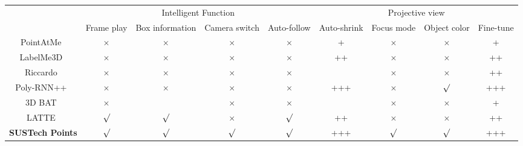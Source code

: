 \documentclass[letterpaper, 10 pt, conference]{ieeeconf}  %
\begin{document}
\begin{table}[]
	\begin{tabular}{c||c|c|c|c||c|c|c|c}
		\hline
		\hline
		\multirow{2}{*}{} & \multicolumn{4}{c||}{Intelligent Function}                         & \multicolumn{4}{c}{Projective view}                 \\
		\cline{2-9}     & Frame play & Box information & Camera switch & Auto-follow & Auto-shrink & Focus mode & Object color & Fine-tune \\ \hline
		PointAtMe~\cite{pointatme}         & $\times$         &   $\times$      &   $\times$    &  $\times$   &      +      &   $\times$ &   $\times$   &    +       \\ \hline
		LabelMe3D~\cite{LabelMe3D}         & $\times$         &   $\times$      &   $\times$    &  $\times$   &     ++      &   $\times$ &   $\times$   &   ++       \\ \hline
		Riccardo~\cite{monica2017multi}          & $\times$         &   $\times$      &   $\times$    &  $\times$   &             &   $\times$ &   $\times$   &   ++       \\ \hline
		Poly-RNN++~\cite{PolyRNN++}        & $\times$         &   $\times$      &   $\times$    &  $\times$   &     +++     &   $\times$ &   $\surd$    &  +++        \\ \hline
		3D BAT~\cite{Zimmer20193DBA}            & $\times$         &                 &   $\times$    &  $\times$   &             &   $\times$ &   $\times$   &    +        \\ \hline
		LATTE~\cite{Wang2019LATTEAL}           & $\surd$          &   $\surd$       &   $\times$    &  $\surd$    &     ++      &   $\times$ &   $\times$   &   ++        \\ \hline
		\textbf{SUSTech Points}              & $\surd$          &   $\surd$       &   $\surd$     &  $\surd$    &      +++      &   $\surd$  &   $\surd$    &  +++        \\ \hline \hline
	\end{tabular}
	\begin{tabular}{p{17cm}}

\end{tabular}
\end{table}
\end{document}
